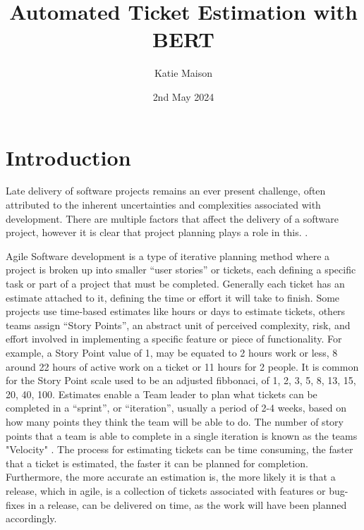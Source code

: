 \documentclass{UoYCSproject}
\author{Katie Maison}
\title{Automated Ticket Estimation with BERT}
\date{2nd May 2024}
\begin{document}
\maketitle
\listoffigures
\listoftables



    \chapter{Introduction}
    \label{ch:introduction}
    \setcounter{page}{1}


    Late delivery of software projects remains an ever present challenge, often attributed to the inherent uncertainties and complexities associated with development.
    There are multiple factors that affect the delivery of a software project, however it is clear that project planning plays a role in this. \cite{CHOW2008961}. \par
    Agile Software development is a type of iterative planning method where a project is broken up into smaller “user stories” or tickets, each defining a specific task or part of a project that must be completed.
    Generally each ticket has an estimate attached to it, defining the time or effort it will take to finish.
    Some projects use time-based estimates like hours or days to estimate tickets, others teams assign “Story Points”, an abstract unit of perceived complexity, risk, and effort involved in implementing a specific feature or piece of functionality.
    For example, a Story Point value of 1, may be equated to 2 hours work or less, 8 around 22 hours of active work on a ticket or 11 hours for 2 people.
    It is common for the Story Point scale used to be an adjusted fibbonaci, of 1, 2, 3, 5, 8, 13, 15, 20, 40, 100.
    Estimates enable a Team leader to plan what tickets can be completed in a “sprint”, or “iteration”, usually a period of 2-4 weeks, based on how many points they think the team will be able to do.
    The number of story points that a team is able to complete in a single iteration is known as the teams "Velocity" \cite{cohn2005agile}.
    The process for estimating tickets can be time consuming, the faster that a ticket is estimated, the faster it can be planned for completion.
    Furthermore, the more accurate an estimation is, the more likely it is that a release, which in agile, is a collection of tickets associated with features or bug-fixes in a release, can be delivered on time, as the work will have been planned accordingly. \par
\end{document}
